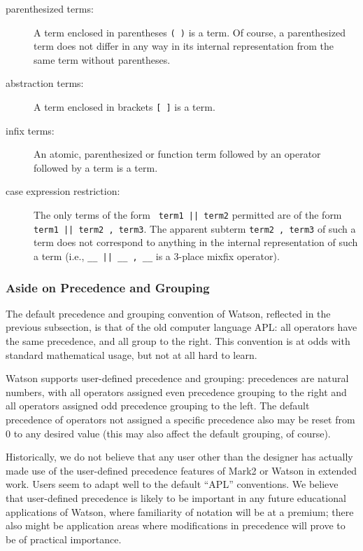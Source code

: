 \documentclass{kluwer}
\begin{document}
\begin{article}
\begin{description}
\item[parenthesized terms:]  
A term enclosed in parentheses {\tt(\,)} is a term.  Of course, a
parenthesized term does not differ in any way in its internal
representation from the same term without parentheses.

\item[abstraction terms:]  A term enclosed in brackets {\tt [\,]} is a term.

\item[infix terms:]  An atomic, parenthesized or function term followed
	by an operator followed by a term is a term.

\item[case expression restriction:] The only terms of the form {\tt
term1 || term2} permitted are of the form {\tt term1 || term2 ,
term3}.  The apparent subterm {\tt term2 , term3} of such a term does
not correspond to anything in the internal representation of such a
term (i.e., {\tt \_\_ || \_\_ , \_\_} is a 3-place mixfix operator).

\end{description}

\subsubsection {Aside on Precedence and Grouping}

The default precedence and grouping convention of Watson, reflected in
the previous subsection, is that of the old computer language APL: all
operators have the same precedence, and all group to the right.  This
convention is at odds with standard mathematical usage, but not at all
hard to learn.

Watson supports user-defined precedence and grouping: precedences are
natural numbers, with all operators assigned even precedence grouping
to the right and all operators assigned odd precedence grouping to the
left.  The default precedence of operators not assigned a specific
precedence also may be reset from 0 to any desired value (this may
also affect the default grouping, of course).

Historically, we do not believe that any user other than the designer
has actually made use of the user-defined precedence features of Mark2
or Watson in extended work.  Users seem to adapt well to the default
``APL'' conventions. We believe that user-defined precedence is likely
to be important in any future educational applications of Watson,
where familiarity of notation will be at a premium; there also might
be application areas where modifications in precedence will prove to
be of practical importance.


\end{article}
\end{document}
